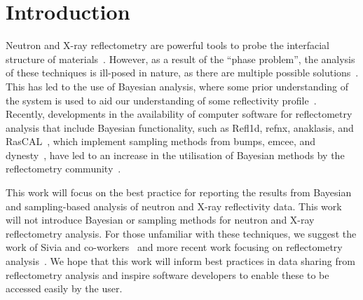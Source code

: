 \documentclass[reprint,superscriptaddress,aps,amsmath]{revtex4-2}
\begin{document}
\maketitle

\section{Introduction}\label{sec:intro}

Neutron and X-ray reflectometry are powerful tools to probe the interfacial structure of materials~\cite{lovell_analysis_1999}.
However, as a result of the ``phase problem'', the analysis of these techniques is ill-posed in nature, as there are multiple possible solutions~\cite{majkrzak_exact_1995}.
This has led to the use of Bayesian analysis, where some prior understanding of the system is used to aid our understanding of some reflectivity profile~\cite{sivia_analysis_1991,geoghegan_experimental_1996,sivia_bayesian_1998}.
Recently, developments in the availability of computer software for reflectometry analysis that include Bayesian functionality, such as Refl1d, refnx, anaklasis, and RasCAL~\cite{kienzle_refl1d_2021,nelson_refnx_2019,koutsioubas_anaklasis_2021,hughes_rascal_2019}, which implement sampling methods from bumps, emcee, and dynesty~\cite{kienzle_bumps_2021,foremanmackey_emcee_2019,speagle_dynesty_2020}, have led to an increase in the utilisation of Bayesian methods by the reflectometry community~\cite{mccluskey_bayesian_2019,mccluskey_general_2020}.

This work will focus on the best practice for reporting the results from Bayesian and sampling-based analysis of neutron and X-ray reflectivity data. 
This work will not introduce Bayesian or sampling methods for neutron and X-ray reflectometry analysis. For those unfamiliar with these techniques, we suggest the work of Sivia and co-workers~\cite{sivia_bayesian_1998,sivia_data_2006} and more recent work focusing on reflectometry analysis~\cite{hughes_physical_2019,mccluskey_general_2020,nelson_refnx_2019,aboljadayel_determining_2021}. 
We hope that this work will inform best practices in data sharing from reflectometry analysis and inspire software developers to enable these to be accessed easily by the user. 
\end{document}
